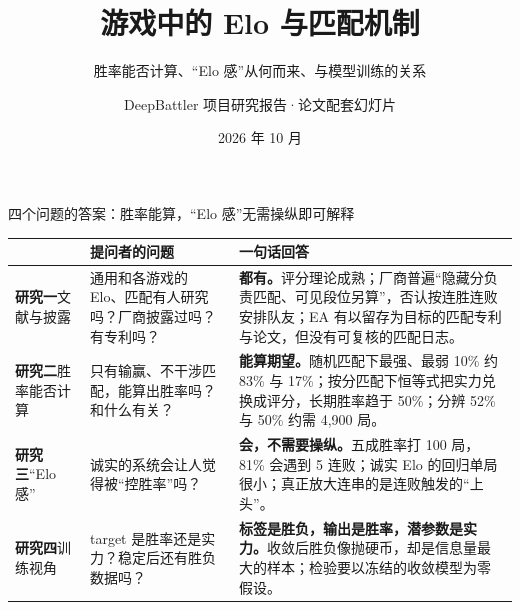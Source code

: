 \documentclass[aspectratio=169,11pt]{beamer}
\title{游戏中的 Elo 与匹配机制}
\subtitle{胜率能否计算、“Elo 感”从何而来、与模型训练的关系}
\author{DeepBattler 项目研究报告\texorpdfstring{\quad·\quad}{ · }论文配套幻灯片}
\date{2026 年 10 月}
\newcommand{\footsec}{}
\newcommand{\setfootsec}[1]{\renewcommand{\footsec}{#1}}
\begin{document}
\setfootsec{}
{\vfuzz=20pt\maketitle}%

\setfootsec{问题与结论速览}
\begin{frame}{四个问题的答案：胜率能算，“Elo 感”无需操纵即可解释}
\footnotesize
\renewcommand{\arraystretch}{1.18}
\begin{tabularx}{\textwidth}{@{}>{\raggedright\arraybackslash}p{1.9cm}>{\raggedright\arraybackslash}p{3.6cm}>{\raggedright\arraybackslash}X@{}}
\toprule
& \textbf{提问者的问题} & \textbf{一句话回答} \\
\midrule
\textbf{\color{cBlue}研究一}\newline 文献与披露 & 通用和各游戏的 Elo、匹配有人研究吗？厂商披露过吗？有专利吗？ & \textbf{都有。}评分理论成熟；厂商普遍“隐藏分负责匹配、可见段位另算”，否认按连胜连败安排队友；EA 有以留存为目标的匹配专利与论文，但没有可复核的匹配日志。\\
\textbf{\color{cBlue}研究二}\newline 胜率能否计算 & 只有输赢、不干涉匹配，能算出胜率吗？和什么有关？ & \textbf{能算期望。}随机匹配下最强、最弱 10\% 约 83\% 与 17\%；按分匹配下恒等式把实力兑换成评分，长期胜率趋于 50\%；分辨 52\% 与 50\% 约需 4,900 局。\\
\textbf{\color{cBlue}研究三}\newline “Elo 感” & 诚实的系统会让人觉得被“控胜率”吗？ & \textbf{会，不需要操纵。}五成胜率打 100 局，81\% 会遇到 5 连败；诚实 Elo 的回归单局很小；真正放大连串的是连败触发的“上头”。\\
\textbf{\color{cBlue}研究四}\newline 训练视角 & target 是胜率还是实力？稳定后还有胜负数据吗？ & \textbf{标签是胜负，输出是胜率，潜参数是实力。}收敛后胜负像抛硬币，却是信息量最大的样本；检验要以冻结的收敛模型为零假设。\\
\bottomrule
\end{tabularx}
\end{frame}
\end{document}
